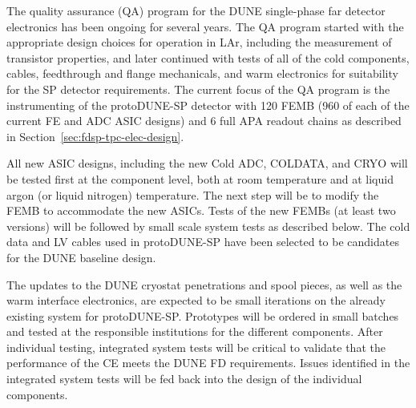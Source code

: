 The quality assurance (QA) program for the DUNE single-phase far detector electronics has been ongoing for several years.  The QA program started with the appropriate design choices for operation
in LAr, including the measurement of transistor properties, and later
continued with tests of all of the cold components, cables, feedthrough and flange mechanicals, and warm electronics for suitability for the SP detector requirements.  The current focus of the QA program is the instrumenting of the protoDUNE-SP detector with 120 FEMB (960 of each of the current FE and ADC ASIC designs) and 6 full APA readout chains as described in Section~\ref{sec:fdsp-tpc-elec-design}.

All new ASIC designs, including the new Cold ADC, COLDATA, and CRYO will be tested first at the component level, both at room temperature and at liquid argon (or liquid nitrogen) temperature. The next step will be to modify the FEMB to accommodate the new ASICs.  Tests of the new FEMBs (at least two versions) will be followed by small scale system tests as described below.  The cold data and LV cables used in protoDUNE-SP have been selected to be candidates for the DUNE baseline design.%

The updates to the DUNE cryostat penetrations and spool pieces, as well as the warm interface electronics, are expected to be small iterations on the already existing system for protoDUNE-SP.  Prototypes will be ordered in small batches and tested at the responsible institutions for the different components.  After individual testing, integrated system tests will be critical to validate that the performance of the CE meets the DUNE FD requirements.  Issues identified in the integrated system tests will be fed back into the design of the individual components.
